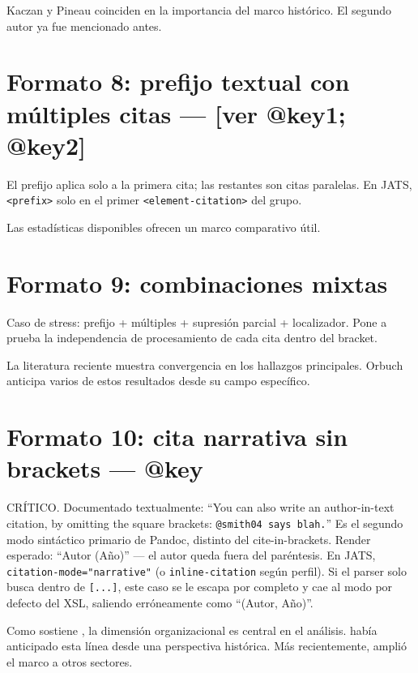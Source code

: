 Kaczan y Pineau \autocite{2961-KACZAN2016} \autocite*{3041-PINEAU1999} coinciden en la importancia del marco histórico. El segundo autor ya fue mencionado antes.


\section{Formato 8: prefijo textual con múltiples citas — [ver @key1; @key2]}
El prefijo aplica solo a la primera cita; las restantes son citas paralelas. En JATS, \texttt{<prefix>} solo en el primer \texttt{<element-citation>} del grupo.

Las estadísticas disponibles \autocite[ver][]{3036-ORBUCH2020,3041-PINEAU1999} ofrecen un marco comparativo útil.


\section{Formato 9: combinaciones mixtas}
Caso de stress: prefijo + múltiples + supresión parcial + localizador. Pone a prueba la independencia de procesamiento de cada cita dentro del bracket.

La literatura reciente \autocite{2961-KACZAN2016,3036-ORBUCH2020} \autocite*{3041-PINEAU1999} muestra convergencia en los hallazgos principales. Orbuch \autocite*[p. 228]{3036-ORBUCH2020} anticipa varios de estos resultados desde su campo específico.


\section{Formato 10: cita narrativa sin brackets — @key}
CRÍTICO. Documentado textualmente: “You can also write an author-in-text citation, by omitting the square brackets: \texttt{@smith04 says blah.}” Es el segundo modo sintáctico primario de Pandoc, distinto del cite-in-brackets. Render esperado: “Autor (Año)” — el autor queda fuera del paréntesis. En JATS, \texttt{citation-mode="narrative"} (o \texttt{inline-citation} según perfil). Si el parser solo busca dentro de \texttt{[...]}, este caso se le escapa por completo y cae al modo por defecto del XSL, saliendo erróneamente como “(Autor, Año)”.

Como sostiene \textcite{2961-KACZAN2016}, la dimensión organizacional es central en el análisis. \textcite{3041-PINEAU1999} había anticipado esta línea desde una perspectiva histórica. Más recientemente, \textcite{3036-ORBUCH2020} amplió el marco a otros sectores.

